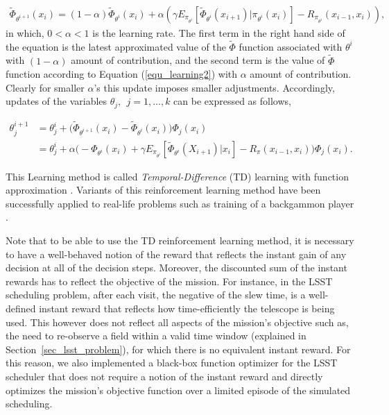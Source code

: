 \documentclass[12pt]{aastex62}
\theoremstyle{definition}
\begin{document}
\begin{equation}\label{equ_updatePHI}
\begin{aligned}
\tilde \Phi_{\theta^{i+1}}(x_{{i}}) = (1-\alpha) \tilde \Phi_{\theta^{i}}(x_{{i}})+ \alpha  ( \gamma  E_{\pi_{\theta^i}}[\tilde \Phi_{\theta^{i}}(x_{{i+1}})|\pi_{\theta^{i}}(x_{{i}})] -R_{\pi_{\theta^i}}(x_{i-1},x_i) ),
\end{aligned}
\end{equation}
in which, $0<\alpha<1$ is the learning rate. The first term in the right hand side of the equation is the latest approximated value of the $\tilde \Phi$ function associated with $\theta^i$ with $(1-\alpha)$ amount of contribution, and the second term is the value of $\tilde \Phi$ function according to Equation (\ref{equ_learning2}) with $\alpha$ amount of contribution. Clearly for smaller $\alpha$'s this update imposes smaller adjustments. Accordingly, updates of the variables $\theta_j,~~j=1,\dots, k$ can be expressed as follows,

\begin{equation} \label{equ_TD_update}
\begin{aligned}
\theta_j^{i+1} &= \theta_j^{i} + \Big( \tilde \Phi_{\theta^{i+1}}(x_{{i}})  - \tilde \Phi_{\theta^{i}}(x_{{i}}) \Big)\Phi_j(x_{i})\\
& = \theta_j^{i} + \alpha \Big(-\Phi_{\theta^{i}}(x_{{i}}) + \gamma  E_{\pi_{\theta^i}}[\tilde \Phi_{\theta^{i}}(X_{{i+1}})|x_{{i}}] -R_{\pi}(x_{i-1},x_i)  \Big)\Phi_j(x_{i}).
\end{aligned}
\end{equation}

This Learning method is called \textit{Temporal-Difference} (TD) learning with function approximation \citep{tsitsiklis1997analysis}. Variants of this reinforcement learning method have been successfully applied to real-life problems such as training of a backgammon player \citep{tesauro1995temporal}.


Note that to be able to use the TD reinforcement learning method, it is necessary to have a well-behaved notion of the reward that reflects the instant gain of any decision at all of the decision steps. Moreover, the discounted sum of the instant rewards has to reflect the objective of the mission. For instance, in the LSST scheduling problem, after each visit, the negative of the slew time, is a well-defined instant reward that reflects how time-efficiently the telescope is being used. This however does not reflect all aspects of the mission's objective such as, the need to re-observe a field within a valid time window (explained in Section~\ref{sec_lsst_problem}), for which there is no equivalent instant reward. For this reason, we also implemented a black-box function optimizer for the LSST scheduler that does not require a notion of the instant reward and directly optimizes the mission's objective function over a limited  episode of the simulated scheduling. 
\end{document}
